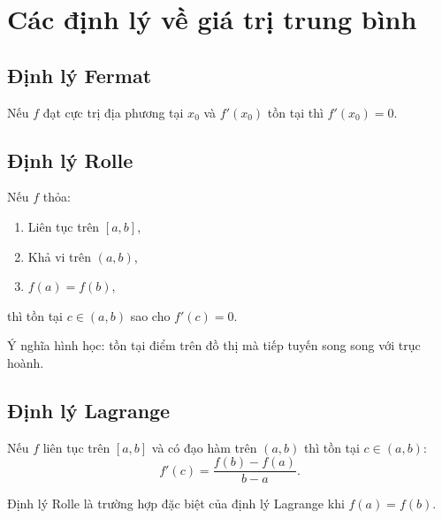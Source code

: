 \documentclass[12pt,a4paper]{article}
\begin{document}
\section{Các định lý về giá trị trung bình}

\subsection{Định lý Fermat}

\begin{dinhly}[title={Định lý Fermat}]
  Nếu $f$ đạt cực trị địa phương tại $x_0$ và $f'(x_0)$ tồn tại thì $f'(x_0) = 0$.
\end{dinhly}

\subsection{Định lý Rolle}

\begin{dinhly}[title={Định lý Rolle}]
  Nếu $f$ thỏa:
  \begin{enumerate}
    \item Liên tục trên $[a,b]$,
    \item Khả vi trên $(a,b)$,
    \item $f(a) = f(b)$,
  \end{enumerate}
  thì tồn tại $c \in (a,b)$ sao cho $f'(c) = 0$.
\end{dinhly}

\begin{luuy}
  Ý nghĩa hình học: tồn tại điểm trên đồ thị mà tiếp tuyến song song với trục hoành.
\end{luuy}

\subsection{Định lý Lagrange}

\begin{dinhly}[title={Định lý Lagrange}]
  Nếu $f$ liên tục trên $[a,b]$ và có đạo hàm trên $(a,b)$ thì tồn tại $c \in (a,b)$:
  \[
    f'(c) = \frac{f(b) - f(a)}{b - a}.
  \]
\end{dinhly}

\begin{luuy}
  Định lý Rolle là trường hợp đặc biệt của định lý Lagrange khi $f(a) = f(b)$. 
\end{luuy}
\end{document}
